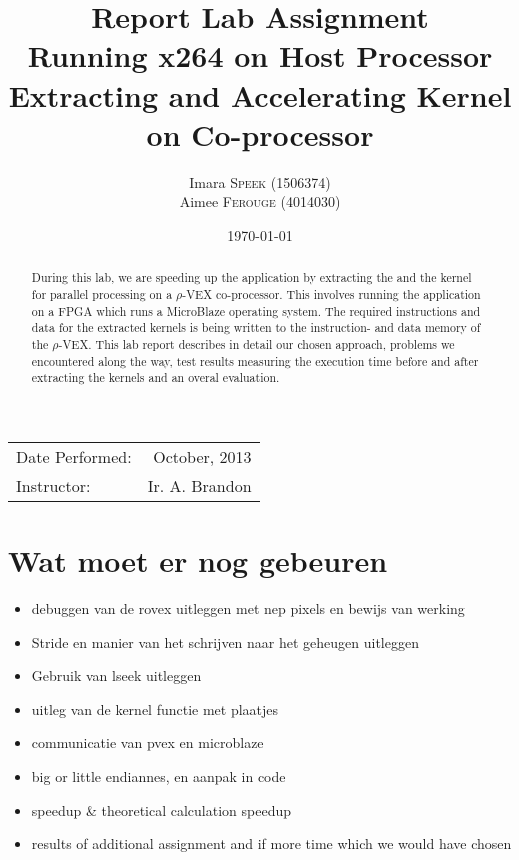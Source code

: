 \documentclass{article}
\title{Report Lab Assignment \\ Running x264 on Host Processor\\ Extracting and Accelerating Kernel on Co-processor} %
\author{Imara \textsc{Speek} (1506374)\\ Aimee \textsc{Ferouge} (4014030)} %
\date{\today} %
\begin{document}
\maketitle %

\begin{center}
\begin{tabular}{l r}
Date Performed: & October, 2013 \\ %
Instructor: & Ir. A. Brandon %
\end{tabular}
\end{center}

 \begin{abstract}
During this lab, we are speeding up the  application by extracting the  and the  kernel for parallel processing on a $\rho$-VEX co-processor. This involves running the  application on a FPGA which runs a MicroBlaze operating system. The required instructions and data for the extracted kernels is being written to the instruction- and data memory of the $\rho$-VEX. This lab report describes in detail our chosen approach, problems we encountered along the way, test results measuring the execution time before and after extracting the kernels and an overal evaluation.
 \end{abstract}


\section{Wat moet er nog gebeuren}
\begin{itemize}
\item debuggen van de rovex uitleggen met nep pixels en bewijs van werking
\item Stride en manier van het schrijven naar het geheugen uitleggen
\item Gebruik van lseek uitleggen
\item uitleg van de kernel functie met plaatjes
\item communicatie van pvex en microblaze
\item big or little endiannes, en aanpak in code
\item speedup \& theoretical calculation speedup
\item results of additional assignment and if more time which we would have chosen
\end{itemize}
\end{document}
